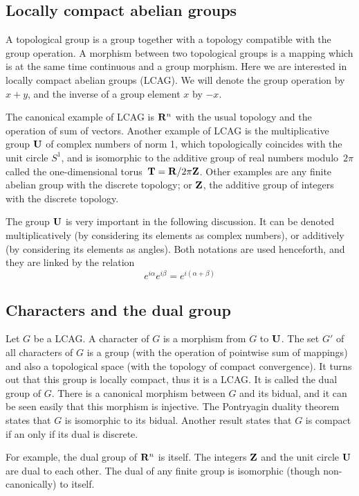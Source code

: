 \subsection{Locally compact abelian groups}

A topological group is a group together with a topology compatible with the
group operation.  A morphism between two topological groups is a mapping
which is at the same time continuous and a group morphism.
Here we are interested in locally compact abelian groups (LCAG).  We
will denote the group operation by $x+y$, and the inverse of a group element
$x$ by $-x$.

The canonical example of LCAG is $\mathbf{R}^n$ with the usual topology and
the operation of sum of vectors.  Another example of LCAG is the
multiplicative group $\mathbf{U}$ of complex numbers of norm 1, which
topologically coincides with the unit circle $S^1$, and is isomorphic
to the additive group of real numbers modulo~$2\pi$ called the
one-dimensional torus~$\mathbf{T}=\mathbf{R}/2\pi\mathbf{Z}$.  Other examples are any
finite abelian group with the discrete topology; or $\mathbf{Z}$, the
additive group of integers with the discrete topology.

The group $\mathbf{U}$ is very important in the following discussion.  It can
be denoted multiplicatively (by considering its elements as complex numbers),
or additively (by considering its elements as angles).  Both notations are
used henceforth, and they are linked by the relation
\[
e^{i\alpha}e^{i\beta}
=
e^{i(\alpha+\beta)}
\]


\subsection{Characters and the dual group}

Let $G$ be a LCAG.  A character of $G$ is a morphism from $G$ to
$\mathbf{U}$.  The set $G'$ of all characters of $G$ is a group (with the
operation of pointwise sum of mappings) and also a topological space (with the topology
of compact convergence).  It turns out that this group is locally compact,
thus it is a LCAG.  It is called the dual group of $G$.  There is a canonical
morphism between $G$ and its bidual, and it can be seen easily that this
morphism is injective.  The Pontryagin duality theorem states that $G$ is
isomorphic to its bidual.  Another result states that $G$ is compact if an
only if its dual is discrete.

For example, the dual group of $\mathbf{R}^n$ is itself.  The integers
$\mathbf{Z}$ and the unit circle $\mathbf{U}$ are dual to each other.
The dual of any finite group is isomorphic (though non-canonically) to
itself.

